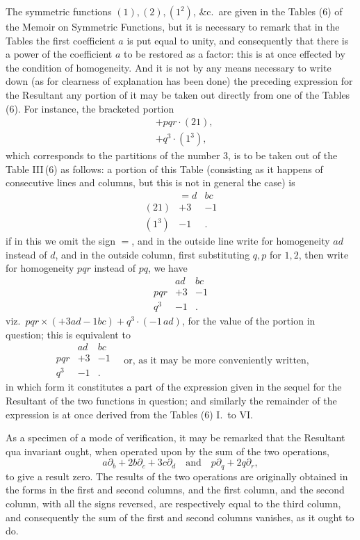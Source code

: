 \documentclass[11pt]{article}
\begin{document}
\noindent The symmetric functions $(1), (2), (1^2)$, \&c.\ are given in the Tables (6) of the Memoir on Symmetric Functions, but it is necessary to remark that in the Tables the first coefficient $a$ is put equal to unity, and consequently that there is a power of the coefficient $a$ to be restored as a factor: this is at once effected by the condition of homogeneity. And it is not by any means necessary to write down (as for clearness of explanation has been done) the preceding expression for the Resultant any portion of it may be taken out directly from one of the Tables (6). For instance, the bracketed portion
\[
\begin{aligned}
&+ pqr \cdot (21),\\
&+ q^3 \cdot (1^3),
\end{aligned}
\]
which corresponds to the partitions of the number 3, is to be taken out of the Table III\,(6) as follows: a portion of this Table (consisting as it happens of consecutive lines and columns, but this is not in general the case) is
\[
\begin{array}{c|cc}
   & = d & bc \\ \hline
(21) & +3 & -1 \\
(1^3) & -1 & .
\end{array}
\]
if in this we omit the sign $=$, and in the outside line write for homogeneity $ad$ instead of $d$, and in the outside column, first substituting $q, p$ for $1, 2$, then write for homogeneity $pqr$ instead of $pq$, we have
\[
\begin{array}{c|cc}
       & ad & bc \\ \hline
pqr  & +3 & -1 \\
q^3  & -1 & .
\end{array}
\]
viz.\ $pqr \times (+3ad - 1bc) + q^3 \cdot (-1\,ad)$, for the value of the portion in question; this is equivalent to
\[
\begin{array}{c|cc}
  & ad & bc \\ \hline
pqr & +3 & -1 \\
q^3 & -1 & .
\end{array}
\quad\text{or, as it may be more conveniently written,}
\]
in which form it constitutes a part of the expression given in the sequel for the Resultant of the two functions in question; and similarly the remainder of the expression is at once derived from the Tables (6) I.\ to VI.

\medskip

\noindent As a specimen of a mode of verification, it may be remarked that the Resultant qua invariant ought, when operated upon by the sum of the two operations,
\[
a\partial_b + 2b\partial_c + 3c\partial_d \quad\text{and}\quad p\partial_q + 2q\partial_r,
\]
to give a result zero. The results of the two operations are originally obtained in the forms in the first and second columns, and the first column, and the second column, with all the signs reversed, are respectively equal to the third column, and consequently the sum of the first and second columns vanishes, as it ought to do.
\end{document}
